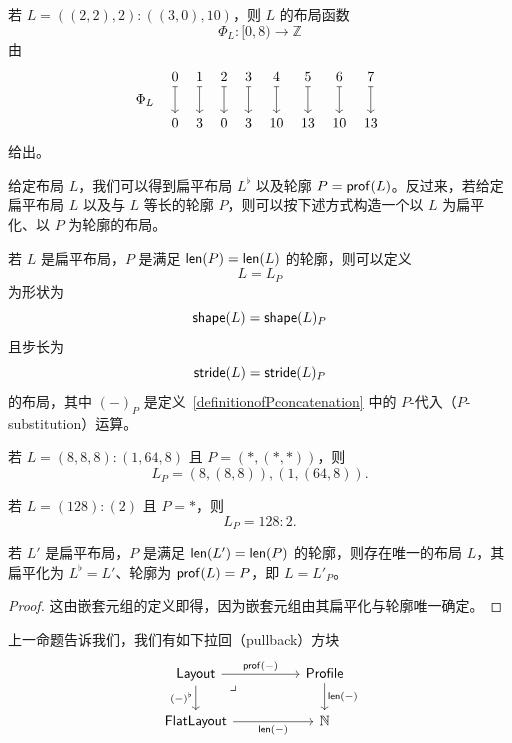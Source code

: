 \begin{example}
    若 $L = ((2,2),2):((3,0),10)$，则 $L$ 的布局函数
    \[
    \Phi_L:[0,8) \to \mathbb{Z}
    \]
    由
    \[ \begin{tikzcd} [row sep = 2, column sep = 4]
    & 0 \ar[dd,mapsto] & 1 \ar[dd,mapsto] & 2 \ar[dd,mapsto] & 3 \ar[dd,mapsto] & 4 \ar[dd,mapsto] & 5 \ar[dd,mapsto] & 6  \ar[dd,mapsto] &  7 \ar[dd,mapsto]\\
    \Phi_L & & &  & & & & & & \\
    & 0 & 3 & 0 & 3 & 10 & 13 & 10 & 13
    \end{tikzcd} \]
    给出。
\end{example}

给定布局 $L$，我们可以得到扁平布局 $L^\flat$ 以及轮廓 $P = \mathsf{prof}(L)$。反过来，若给定扁平布局 $L$ 以及与 $L$ 等长的轮廓 $P$，则可以按下述方式构造一个以 $L$ 为扁平化、以 $P$ 为轮廓的布局。

\begin{construction}\label{layoutfromflatlayoutandprofile}
若 $L$ 是扁平布局，$P$ 是满足 $\mathsf{len}(P) = \mathsf{len}(L)$ 的轮廓，则可以定义
\[
L = L_P
\]
为形状为
\[
\mathsf{shape}(L) = \mathsf{shape}(L)_P
\]
且步长为
\[
\mathsf{stride}(L) = \mathsf{stride}(L)_P
\]
的布局，其中 $(-)_P$ 是定义~\ref{definitionofPconcatenation} 中的 $P$-代入（$P$-substitution）运算。
\end{construction}

\begin{example}
    若 $L = (8,8,8):(1,64,8)$ 且 $P = (*,(*,*))$，则
    \[
    L_P = (8,(8,8)),(1,(64,8)).
    \]
\end{example}

\begin{example}
    若 $L = (128):(2)$ 且 $P = *$，则
    \[
    L_P = 128:2.
    \]
\end{example}

\begin{proposition}
    若 $L'$ 是扁平布局，$P$ 是满足 $\mathsf{len}(L') = \mathsf{len}(P)$ 的轮廓，则存在唯一的布局 $L$，其扁平化为 $L^\flat = L'$、轮廓为 $\mathsf{prof}(L) = P$，即 $L = L'_P$。
\end{proposition}

\begin{proof}
    这由嵌套元组的定义即得，因为嵌套元组由其扁平化与轮廓唯一确定。
\end{proof}

\begin{observation}
    上一命题告诉我们，我们有如下拉回（pullback）方块
    \[ \begin{tikzcd} 
    \mathterm{Layout}\ar[rr,"\profile(-)"] \ar[d,swap,"(-)^\flat"] \arrow[drr, phantom, "\lrcorner", very near start] & & \mathterm{Profile}\ar[d,"\len(-)"] \\
    \mathterm{FlatLayout} \ar[rr,swap,"\len(-)"] & & \mathbb{N}
    \end{tikzcd} \]
\end{observation}

